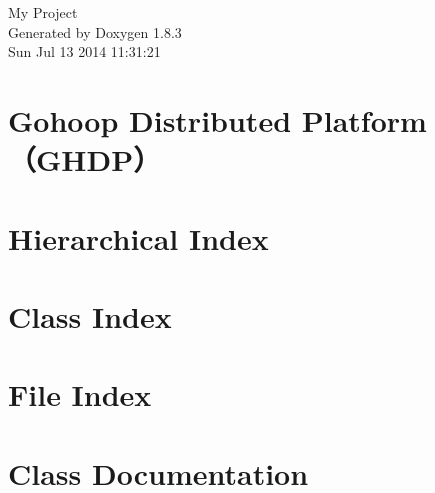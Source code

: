 \documentclass{book}
\begin{document}
\hypersetup{pageanchor=false,citecolor=blue}
\begin{titlepage}
\vspace*{7cm}
\begin{center}
{\Large My Project }\\
\vspace*{1cm}
{\large Generated by Doxygen 1.8.3}\\
\vspace*{0.5cm}
{\small Sun Jul 13 2014 11:31:21}\\
\end{center}
\end{titlepage}
\clearemptydoublepage
{}
\tableofcontents
\clearemptydoublepage
{}
\hypersetup{pageanchor=true,citecolor=blue}
\chapter{Gohoop Distributed Platform（\-G\-H\-D\-P）}
\label{index}\hypertarget{index}{}
\chapter{Hierarchical Index}

\chapter{Class Index}

\chapter{File Index}

\chapter{Class Documentation}










































\end{document}
